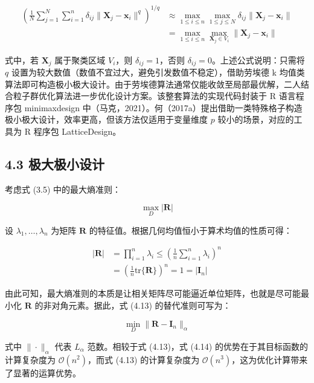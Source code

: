 \documentclass{ctexart}
\begin{document}
\begin{align*}
\left(\frac{1}{N}\sum_{j=1}^N\sum_{i=1}^n\delta_{ij}\|\boldsymbol{X}_j-\boldsymbol{x}_i\|^q\right)^{1/q}&\approx\max_{1\le i\le n}\max_{1\le j\le N}\delta_{ij}\|\boldsymbol{X}_j-\boldsymbol{x}_i\|\\
&=\max_{1\le i\le n}\max_{\boldsymbol{X}_j\in V_i}\|\boldsymbol{X}_j-\boldsymbol{x}_i\|
\end{align*}

式中，若 $\boldsymbol{X}_j$ 属于聚类区域 $V_i$，则 $\delta_{ij}=1$，否则 $\delta_{ij}=0$。上述公式说明：只需将 $q$ 设置为较大数值（数值不宜过大，避免引发数值不稳定），借助劳埃德 k 均值类算法即可构造极小极大设计。由于劳埃德算法通常仅能收敛至局部最优解，二人结合粒子群优化算法进一步优化设计方案。该整套算法的实现代码封装于 R 语言程序包 minimaxdesign 中（马克，2021）。何（2017a）提出借助一类特殊格子构造极小极大设计，效率更高，但该方法仅适用于变量维度 $p$ 较小的场景，对应的工具为 R 程序包 LatticeDesign。

\subsection*{4.3 极大极小设计}

考虑式 (3.5) 中的最大熵准则：

\begin{equation*}
\max_D|\boldsymbol{R}|
\tag{4.13}
\end{equation*}

设 $\lambda_1,\dots,\lambda_n$ 为矩阵 $\boldsymbol{R}$ 的特征值。根据几何均值恒小于算术均值的性质可得：

\begin{align*}
|\boldsymbol{R}|&=\prod_{i=1}^n\lambda_i\le\left(\frac{1}{n}\sum_{i=1}^n\lambda_i\right)^n\\
&=\left(\frac{1}{n}\mathrm{tr}\{\boldsymbol{R}\}\right)^n=1=|\boldsymbol{I}_n|
\end{align*}

由此可知，最大熵准则的本质是让相关矩阵尽可能逼近单位矩阵，也就是尽可能最小化 $\boldsymbol{R}$ 的非对角元素。据此，式 (4.13) 的替代准则可写为：

\begin{equation*}
\min_D\|\boldsymbol{R}-\boldsymbol{I}_n\|_\alpha
\tag{4.14}
\end{equation*}

式中 $\|\cdot\|_\alpha$ 代表 $L_\alpha$ 范数。相较于式 (4.13)，式 (4.14) 的优势在于其目标函数的计算复杂度为 $\mathcal{O}(n^2)$，而式 (4.13) 的计算复杂度为 $\mathcal{O}(n^3)$，这为优化计算带来了显著的运算优势。
\end{document}
